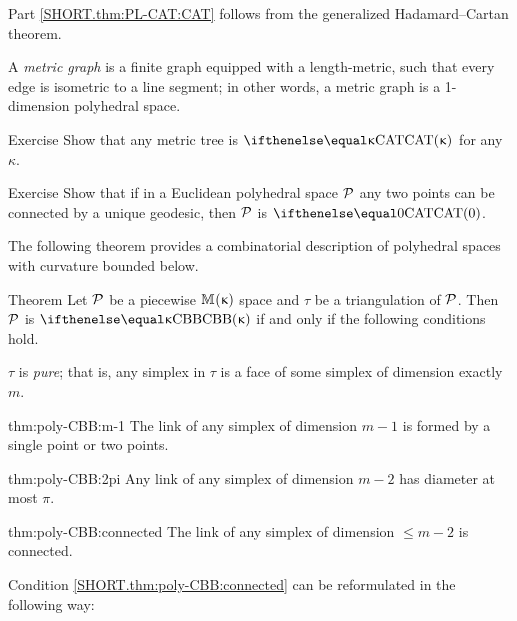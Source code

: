 Part \ref{SHORT.thm:PL-CAT:CAT} follows from the generalized Hadamard--Cartan theorem.
\qeds

A \emph{metric graph} is a finite graph equipped with a length-metric, such that every edge is isometric to a line segment;
in other words, a metric graph is a 1-dimension polyhedral space.

\begin{thm}{Exercise}\label{ex:metric tree}
Show that any metric tree is $\CAT\kappa$ for any $\kappa$.
\end{thm}


\begin{thm}{Exercise}\label{ex:poly-unique-geodesic}
Show that if in a Euclidean polyhedral space $\mathcal{P}$
any two points can be connected by a unique geodesic,  
then $\mathcal{P}$ is $\CAT0$.
\end{thm}

The following theorem provides a combinatorial description of polyhedral spaces with curvature bounded below.

\begin{thm}{Theorem}\label{thm:poly-CBB} Let $\mathcal{P}$ be a piecewise
$\mathbb{M}_{{}}^{}({\upkappa})$ space and $\tau$ be a triangulation of $\mathcal{P}$.
Then $\mathcal{P}$ is $\Alex\kappa$ if and only if the following conditions hold.

\begin{subthm}{} $\tau$ is \emph{pure}; 
that is, any simplex in $\tau$ is  a face of some simplex of dimension exactly $m$. 
\end{subthm}

\begin{subthm}{thm:poly-CBB:m-1}
The link of any simplex of dimension $m-1$ is formed by a single point or two points.
\end{subthm}

\begin{subthm}{thm:poly-CBB:2pi}
Any link of any simplex of dimension $m-2$
has diameter at most $\pi$.
\end{subthm}

\begin{subthm}{thm:poly-CBB:connected}
The link of any simplex of dimension $\le m-2$ is connected.
\end{subthm}

\end{thm}

Condition \ref{SHORT.thm:poly-CBB:connected}
can be reformulated in the following way:

